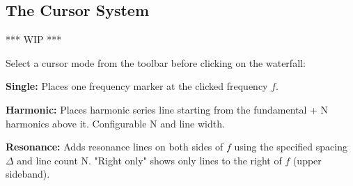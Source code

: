 \subsection{The Cursor System}
\textcolor{commentGreen}{*** WIP ***}

Select a cursor mode from the toolbar before clicking on the waterfall:

\begin{compactitem}
\item \textbf{Single:} Places one frequency marker at the clicked frequency $f$.
\item \textbf{Harmonic:} Places harmonic series line starting from the fundamental + N harmonics above it. Configurable N and line width.
\item \textbf{Resonance:} Adds resonance lines on both sides of $f$ using the specified spacing $\Delta$ and line count N. "Right only" shows only lines to the right of $f$ (upper sideband).
\end{compactitem}


\pagebreak